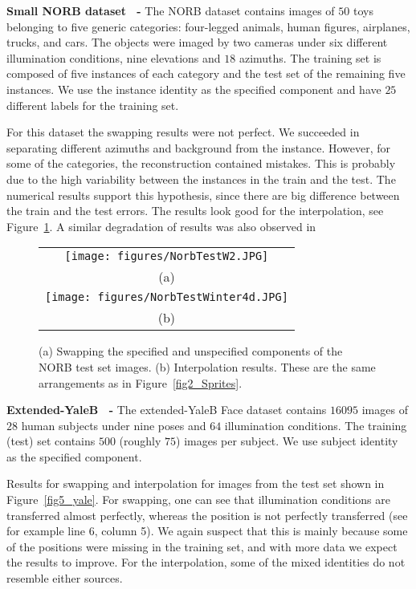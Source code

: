 \documentclass[10pt,twocolumn,letterpaper]{article}
\begin{document}
\textbf{Small NORB dataset~\cite{norb} -} The NORB dataset contains images of $50$ toys belonging to five generic categories: four-legged animals, human figures, airplanes, trucks, and cars. The objects were imaged by two cameras under six different illumination conditions, nine elevations and $18$ azimuths.
The training set is composed of five instances of each category and the test set of the remaining five instances. We use the instance identity as the specified component and have $25$ different labels for the training set. 

For this dataset the swapping results were not perfect. We succeeded in separating different azimuths and background from the instance.
However, for some of the categories, the reconstruction contained mistakes. This is probably due to the high variability between the instances in the train and the test. The numerical results support this hypothesis, since there are big difference between the train and the test errors. The results look good for the interpolation, see Figure~\ref{fig3_norb}. A similar degradation of results was also observed in~\cite{disentanglement}

\begin{figure}[t]
  \centering
  \begin{tabular}{c}
    \texttt{[image: figures/NorbTestW2.JPG]}\\(a)\\
  \texttt{[image: figures/NorbTestWinter4d.JPG]}\\
    (b)\\
    \end{tabular}
  \caption{\label{fig3_norb} (a) Swapping the specified and unspecified components of the NORB test set images. (b) Interpolation results. These are the same arrangements as in Figure~\ref{fig2_Sprites}.}
\end{figure}


\textbf{Extended-YaleB~\cite{yaleB} -} The extended-YaleB Face dataset contains $16095$ images of $28$ human subjects under nine poses and $64$ illumination conditions. 
The training (test) set contains $500$ (roughly $75$) images per subject. We use subject identity as the specified component. 

Results for swapping and interpolation for images from the test set shown in Figure~\ref{fig5_yale}. For swapping, one can see that illumination conditions are transferred almost perfectly, whereas the position is not perfectly transferred (see for example line 6, column 5). We again suspect that this is mainly because some of the positions were missing in the training set, and with more data we expect the results to improve. For the interpolation, some of the mixed identities do not resemble either sources. 
\end{document}
